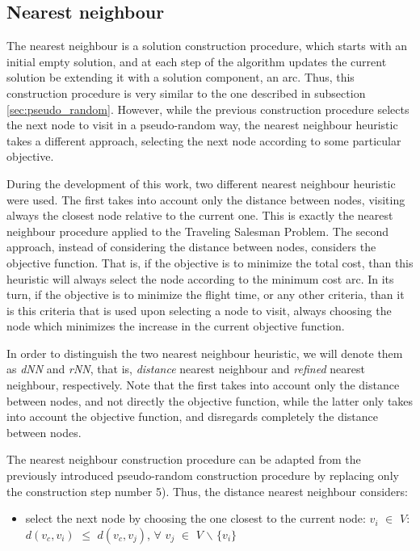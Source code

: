 \subsection{Nearest neighbour}
\label{sec:nn}

The nearest neighbour is a solution construction procedure, which starts with an initial empty solution, and at each step of the algorithm updates the current solution be extending it with a solution component, an arc. Thus, this construction procedure is very similar to the one described in subsection \ref{sec:pseudo_random}. However, while the previous construction procedure selects the next node to visit in a pseudo-random way, the nearest neighbour heuristic takes a different approach, selecting the next node according to some particular objective.

During the development of this work, two different nearest neighbour heuristic were used. The first takes into account only the distance between nodes, visiting always the closest node relative to the current one. This is exactly the nearest neighbour procedure applied to the Traveling Salesman Problem. The second approach, instead of considering the distance between nodes, considers the objective function. That is, if the objective is to minimize the total cost, than this heuristic will always select the node according to the minimum cost arc. In its turn, if the objective is to minimize the flight time, or any other criteria, than it is this criteria that is used upon selecting a node to visit, always choosing the node which minimizes the increase in the current objective function. 

In order to distinguish the two nearest neighbour heuristic, we will denote them as \textit{dNN} and \textit{rNN}, that is, \textit{distance} nearest neighbour and  \textit{refined} nearest neighbour, respectively. Note that the first takes into account only the distance between nodes, and not directly the objective function, while the latter only takes into account the objective function, and disregards completely the distance between nodes.

The nearest neighbour construction procedure can be adapted from the previously introduced pseudo-random construction procedure by replacing only the construction step number 5). Thus, the distance nearest neighbour considers:

\begin{itemize}
    \item select the next node by choosing the one closest to the current node: \newline
    $v_i$ $\in$ $V$: $d(v_c, v_i)$ $\leq$ $d(v_c, v_j)$,
    $\forall$ $v_j$ $\in$ $V$ $\backslash$ $\{v_i\}$   
\end{itemize}

